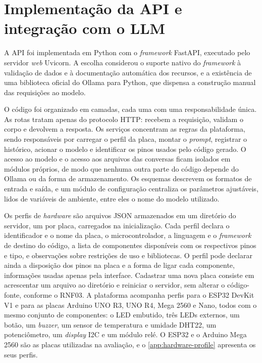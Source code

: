 \section{Implementação da API e integração com o LLM}
\label{sec:method-api}

A API foi implementada em Python com o \textit{framework} FastAPI, executado pelo servidor \textit{web} Uvicorn. A escolha considerou o suporte nativo do \textit{framework} à validação de dados e à documentação automática dos recursos, e a existência de uma biblioteca oficial do Ollama para Python, que dispensa a construção manual das requisições ao modelo.

O código foi organizado em camadas, cada uma com uma responsabilidade única. As rotas tratam apenas do protocolo HTTP: recebem a requisição, validam o corpo e devolvem a resposta. Os serviços concentram as regras da plataforma, sendo responsáveis por carregar o perfil da placa, montar o \textit{prompt}, registrar o histórico, acionar o modelo e identificar os pinos usados pelo código gerado. O acesso ao modelo e o acesso aos arquivos das conversas ficam isolados em módulos próprios, de modo que nenhuma outra parte do código depende do Ollama ou da forma de armazenamento. Os esquemas descrevem os formatos de entrada e saída, e um módulo de configuração centraliza os parâmetros ajustáveis, lidos de variáveis de ambiente, entre eles o nome do modelo utilizado.

Os perfis de \textit{hardware} são arquivos JSON armazenados em um diretório do servidor, um por placa, carregados na inicialização. Cada perfil declara o identificador e o nome da placa, o microcontrolador, a linguagem e o \textit{framework} de destino do código, a lista de componentes disponíveis com os respectivos pinos e tipo, e observações sobre restrições de uso e bibliotecas. O perfil pode declarar ainda a disposição dos pinos na placa e a forma de ligar cada componente, informações usadas apenas pela interface. Cadastrar uma nova placa consiste em acrescentar um arquivo ao diretório e reiniciar o servidor, sem alterar o código-fonte, conforme o RNF03. A plataforma acompanha perfis para o ESP32 DevKit V1 e para as placas Arduino UNO R3, UNO R4, Mega 2560 e Nano, todos com o mesmo conjunto de componentes: o LED embutido, três LEDs externos, um botão, um \textit{buzzer}, um sensor de temperatura e umidade DHT22, um potenciômetro, um \textit{display} I2C e um módulo relé. O ESP32 e o Arduino Mega 2560 são as placas utilizadas na avaliação, e o \autoref{app:hardware-profile} apresenta os seus perfis.

